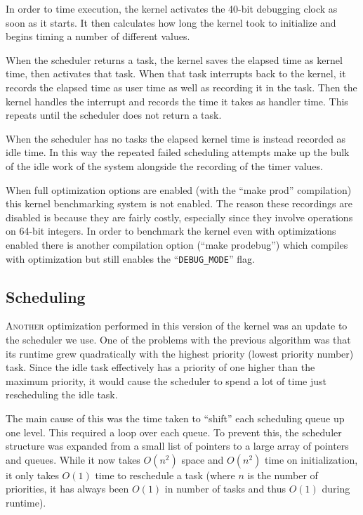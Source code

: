 \documentclass{article}
\begin{document}
In order to time execution, the kernel activates the 40-bit debugging clock as
soon as it starts. It then calculates how long the kernel took to initialize and
begins timing a number of different values.

When the scheduler returns a task, the kernel saves the elapsed time as kernel
time, then activates that task. When that task interrupts back to the kernel, it
records the elapsed time as user time as well as recording it in the task. Then
the kernel handles the interrupt and records the time it takes as handler time.
This repeats until the scheduler does not return a task.

When the scheduler has no tasks the elapsed kernel time is instead recorded as
idle time. In this way the repeated failed scheduling attempts make up the bulk
of the idle work of the system alongside the recording of the timer values.

When full optimization options are enabled (with the ``make prod'' compilation)
this kernel benchmarking system is not enabled. The reason these recordings are
disabled is because they are fairly costly, especially since they involve
operations on 64-bit integers. In order to benchmark the kernel even with
optimizations enabled there is another compilation option (``make prodebug'')
which compiles with optimization but still enables the ``\texttt{DEBUG\_MODE}''
flag.

\subsection*{Scheduling}

\textsc{Another} optimization performed in this version of the kernel was an
update to the scheduler we use. One of the problems with the previous algorithm
was that its runtime grew quadratically with the highest priority (lowest
priority number) task. Since the idle task effectively has a priority of one
higher than the maximum priority, it would cause the scheduler to spend a lot of
time just rescheduling the idle task.

The main cause of this was the time taken to ``shift'' each scheduling queue up
one level. This required a loop over each queue. To prevent this, the scheduler
structure was expanded from a small list of pointers to a large array of
pointers and queues. While it now takes $O(n^2)$ space and $O(n^2)$ time on
initialization, it only takes $O(1)$ time to reschedule a task (where $n$ is the
number of priorities, it has always been $O(1)$ in number of tasks and thus
$O(1)$ during runtime).
\end{document}
